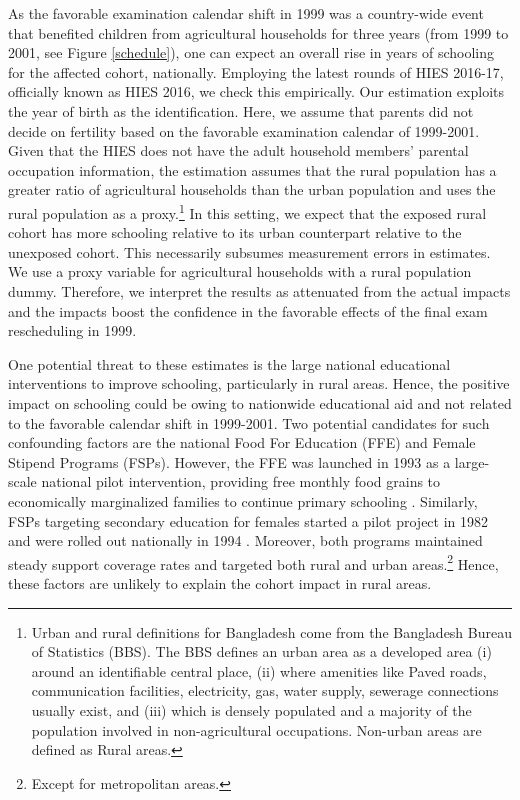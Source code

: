 \documentclass[12pt,letterpaper]{article}
\newcommand{\0}{\ensuremath{\mbox{\boldmath $0$}}}
\begin{document}
As the favorable examination calendar shift in 1999 was a country-wide event that benefited children from agricultural households for three years (from 1999 to 2001, see Figure \ref{schedule}), one can expect an overall rise in years of schooling for the affected cohort, nationally. Employing the latest rounds of HIES 2016-17, officially known as HIES 2016, we check this empirically. Our estimation exploits the year of birth as the identification. Here, we assume that parents did not decide on fertility based on the favorable examination calendar of 1999-2001. Given that the HIES does not have the adult household members' parental occupation information, the estimation assumes that the rural population has a greater ratio of agricultural households than the urban population and uses the rural population as a proxy.\footnote{Urban and rural definitions for Bangladesh come from the Bangladesh Bureau of Statistics (BBS). The BBS defines an urban area as a developed area (i) around an identifiable central place, (ii) where amenities like Paved roads, communication facilities, electricity, gas, water supply, sewerage connections usually exist, and (iii) which is densely populated and a majority of the population involved in non-agricultural occupations. Non-urban areas are defined as Rural areas.} In this setting, we expect that the exposed rural cohort has more schooling relative to its urban counterpart relative to the unexposed cohort. This necessarily subsumes measurement errors in estimates. We use a proxy variable for agricultural households with a rural population dummy. Therefore, we interpret the results as attenuated from the actual impacts and the impacts boost the confidence in the favorable effects of the final exam rescheduling in 1999.

One potential threat to these estimates is the large national educational interventions to improve schooling, particularly in rural areas. Hence, the positive impact on schooling could be owing to nationwide educational aid and not related to the favorable calendar shift in 1999-2001. Two potential candidates for such confounding factors are the national Food For Education (FFE) and Female Stipend Programs (FSPs). However, the FFE was launched in 1993 as a large-scale national pilot intervention, providing free monthly food grains to economically marginalized families to continue primary schooling  \citep{ahmed2002food}. Similarly, FSPs targeting secondary education for females started a pilot project in 1982 and were rolled out nationally in 1994  \citep{xu2022assessing}. Moreover, both programs maintained steady support coverage rates and targeted both rural and urban areas.\footnote{Except for metropolitan areas.} Hence, these factors are unlikely to explain the cohort impact in rural areas. 
\end{document}
